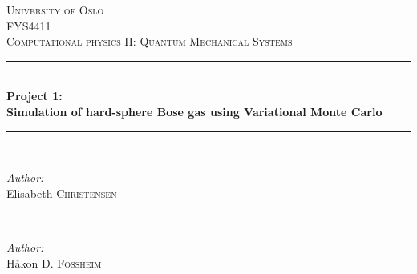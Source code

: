 \documentclass[
    a4paper, aps, twocolumn, floatfix, superscriptaddress,
    nofootinbib]{revtex4-1}
\title{}
\begin{document}


{\setlength\doublerulesep{5pt}}   %

\begin{titlepage}

\newcommand{\HRule}{\rule{\linewidth}{0.5mm}} %

\center %
 

\textsc{\LARGE University of Oslo}\\[1.5cm] %
\textsc{\Large FYS4411}\\[0.5cm] %
\textsc{\large Computational physics II: Quantum Mechanical Systems}\\[0.5cm] %


\HRule \\[0.4cm]
{ \huge \bfseries Project 1: \\ Simulation of hard-sphere Bose gas using Variational Monte Carlo}\\[0.4cm] %
\HRule \\[1.5cm]
 

\begin{minipage}{0.4\textwidth}
\begin{flushleft} \large
\emph{Author:}\\
Elisabeth \textsc{Christensen} %
\end{flushleft}
\end{minipage}
~
\begin{minipage}{0.4\textwidth}
\begin{flushright} \large
\emph{Author:} \\
Håkon \textsc{D. Fossheim} %
\end{flushright}


\end{minipage}
\end{titlepage}
\end{document}
